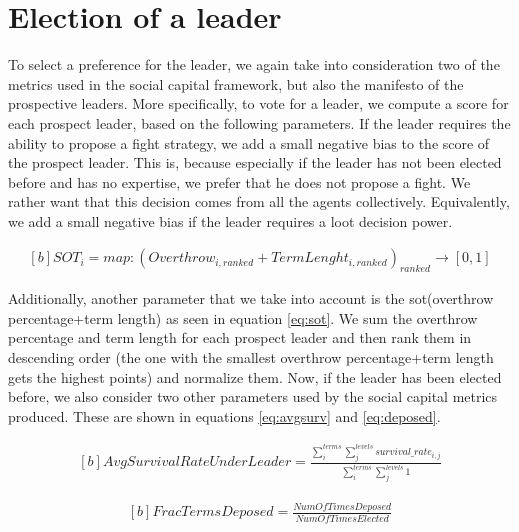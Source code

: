 \section{Election of a leader}To select a preference for the leader, we again take into consideration two of the metrics used in the social capital framework, but also the manifesto of the prospective leaders. More specifically, to vote for a leader, we compute a score for each prospect leader, based on the following parameters. If the leader requires the ability to propose a fight strategy, we add a small negative bias to the score of the prospect leader. This is, because especially if the leader has not been elected before and has no expertise, we prefer that he does not propose a fight. We rather want that this decision comes from all the agents collectively. Equivalently, we add a small negative bias if the leader requires a loot decision power.

\begin{equation}\label{eq:sot}
\begin{aligned}[b]
SOT_i = map : (Overthrow_{i,ranked} + TermLenght_{i, ranked})_{ranked} \rightarrow [0,1]
\end{aligned}
\end{equation}

Additionally, another parameter that we take into account is the sot(overthrow percentage+term length) as seen in equation \ref{eq:sot}. We sum the overthrow percentage and term length for each prospect leader and then rank them in descending order (the one with the smallest overthrow percentage+term length gets the highest points) and normalize them. Now, if the leader has been elected before, we also consider two other parameters used by the social capital metrics produced. These are shown in equations \ref{eq:avgsurv} and \ref{eq:deposed}.

\begin{equation}\label{eq:avgsurv}
\begin{aligned}[b]
AvgSurvivalRateUnderLeader = \frac{\sum_{i} ^{terms} \sum_{j}^{levels} survival\_rate_{i,j}}{\sum_{i}^{terms} \sum_{j}^{levels} 1}
\end{aligned}
\end{equation}

\begin{equation}\label{eq:deposed}
\begin{aligned}[b]
FracTermsDeposed = \frac{NumO\!f\!TimesDeposed}{NumO\!f\!TimesElected}
\end{aligned}
\end{equation}

